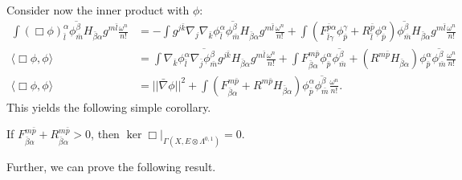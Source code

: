\documentclass{../mathnotes}
\begin{document}
Consider now the inner product with $\phi$:
\begin{align*}
    \int (\Box\phi)^{\alpha}_{\bar l}\overline{\phi^\beta_{\bar m}}H_{\bar \beta\alpha}g^{m\bar l}\frac{\omega^n}{n!}&=-\int g^{j\bar k}\nabla_j\nabla_{\bar k}\phi^\alpha_{\bar l}\overline{\phi^\beta_{\bar m}}H_{\bar\beta\alpha}g^{m\bar l}\frac{\omega^n}{n!}+\int (F_{\bar l\gamma}^{\bar p\alpha}\phi^\gamma_{\bar p}+R_{\bar l}^{\bar p}\phi^\alpha_{\bar p})\overline{\phi^\beta_{\bar m}}H_{\bar\beta\alpha}g^{m\bar l}\frac{\omega^n}{n!}\\
    \langle\Box\phi,\phi\rangle&=\int \nabla_{\bar k}\phi^\alpha_{\bar l}\overline{\nabla_{\bar j}\phi^\beta_{\bar m}}g^{j\bar k}H_{\bar\beta\alpha}g^{m\bar l}\frac{\omega^n}{n!}+\int F^{m\bar p}_{\bar\beta\alpha}\phi_{\bar p}^\alpha\overline{\phi^\beta_{\bar m}}+(R^{m\bar p}H_{\bar\beta\alpha})\phi^\alpha_{\bar p}\overline{\phi^\beta_{\bar m}}\frac{\omega^n}{n!}\\
    \langle\Box\phi,\phi\rangle&=||\bar\nabla\phi||^2+\int (F^{m\bar p}_{\bar\beta\alpha}+R^{m\bar p}H_{\bar\beta\alpha})\phi^\alpha_{\bar p}\overline{\phi^\beta_{\bar m}}\frac{\omega^n}{n!}.
\end{align*}
This yields the following simple corollary.

\begin{cor}
If $F^{m\bar p}_{\bar\beta\alpha}+R^{m\bar p}_{\bar\beta\alpha}>0$, then $\ker\Box\bigg|_{\Gamma(X,E\otimes\Lambda^{0,1})}=0.$
\end{cor}

Further, we can prove the following result.
\end{document}
